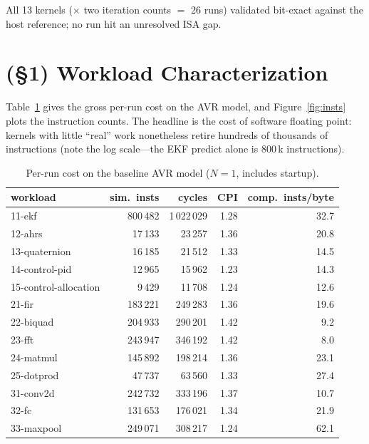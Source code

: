 \documentclass[11pt]{article}
\begin{document}
All 13 kernels ($\times$ two iteration counts $=$ 26 runs) validated bit-exact against the host reference;
no run hit an unresolved ISA gap.

\section{(\S1) Workload Characterization}

Table~\ref{tab:s1} gives the gross per-run cost on the AVR model, and Figure~\ref{fig:insts} plots the
instruction counts. The headline is the cost of software floating point: kernels with little ``real''
work nonetheless retire hundreds of thousands of instructions (note the log scale---the EKF predict alone
is 800\,k instructions).

\begin{table}[ht]\centering\small
\caption{Per-run cost on the baseline AVR model ($N{=}1$, includes startup).}\label{tab:s1}
\begin{tabular}{@{}lrrrr@{}}
\toprule
workload & sim.\ insts & cycles & CPI & comp.\ insts/byte \\
\midrule
11-ekf & 800\,482 & 1\,022\,029 & 1.28 & 32.7 \\
12-ahrs & 17\,133 & 23\,257 & 1.36 & 20.8 \\
13-quaternion & 16\,185 & 21\,512 & 1.33 & 14.5 \\
14-control-pid & 12\,965 & 15\,962 & 1.23 & 14.3 \\
15-control-allocation & 9\,429 & 11\,708 & 1.24 & 12.6 \\
21-fir & 183\,221 & 249\,283 & 1.36 & 19.6 \\
22-biquad & 204\,933 & 290\,201 & 1.42 & 9.2 \\
23-fft & 243\,947 & 346\,192 & 1.42 & 8.0 \\
24-matmul & 145\,892 & 198\,214 & 1.36 & 23.1 \\
25-dotprod & 47\,737 & 63\,560 & 1.33 & 27.4 \\
31-conv2d & 242\,732 & 333\,196 & 1.37 & 10.7 \\
32-fc & 131\,653 & 176\,021 & 1.34 & 21.9 \\
33-maxpool & 249\,071 & 308\,217 & 1.24 & 62.1 \\
\bottomrule
\end{tabular}
\end{table}
\end{document}
